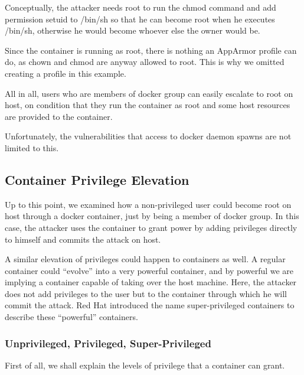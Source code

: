 Conceptually, the attacker needs root to run the chmod command and add permission setuid to /bin/sh so that he can become root when he executes /bin/sh, otherwise he would become whoever else the owner would be.

Since the container is running as root, there is nothing an AppArmor profile can do, as chown and chmod are anyway allowed to root. This is why we omitted creating a profile in this example.

All in all, users who are members of docker group can easily escalate to root on host, on condition that they run the container as root and some host resources are provided to the container.

Unfortunately, the vulnerabilities that access to docker daemon spawns are not limited to this.

\subsection{Container Privilege Elevation}
Up to this point, we examined how a non-privileged user could become root on host through a docker container, just by being a member of docker group. In this case, the attacker uses the container to grant power by adding privileges directly to himself and commits the attack on host.

A similar elevation of privileges could happen to containers as well. A regular container could “evolve” into a very powerful container, and by powerful we are implying a container capable of taking over the host machine. Here, the attacker does not add privileges to the user but to the container through which he will commit the attack. Red Hat introduced the name super-privileged containers to describe these “powerful” containers. 

\subsubsection{Unprivileged, Privileged, Super-Privileged}
First of all, we shall explain the levels of privilege that a container can grant. 

